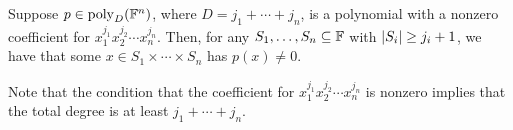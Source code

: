 \begin{boxtheorem} \label{Ch8:Thm:Combinatorial_Nullstellensatz}
    Suppose $p \in \operatorname{poly}_D\!\left( \mathbb{F}^n \right)$, where $D = j_1 + \cdots + j_n$, is a polynomial with a nonzero coefficient for $x_1^{j_1} x_2^{j_2} \cdots x_n^{j_n}$. Then, for any $S_1, \ldots, S_n \subseteq \mathbb{F}$ with $\left\lvert S_i \right\rvert \geq j_i + 1$, we have that some $x \in S_1 \times \cdots \times S_n$ has $p(x) \neq 0$.
\end{boxtheorem}
\begin{remark}
    Note that the condition that the coefficient for $x_1^{j_1} x_2^{j_2} \cdots x_n^{j_n}$ is nonzero implies that the total degree is at least $j_1 + \cdots + j_n$.
\end{remark}
